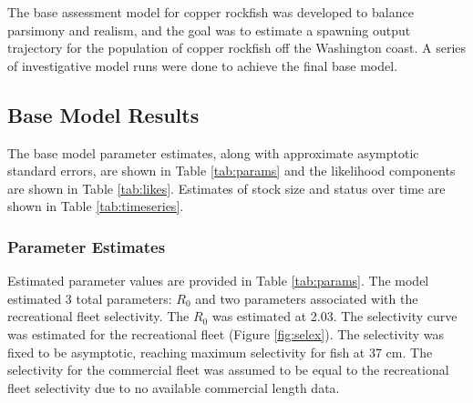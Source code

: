 \documentclass[11pt,
  english,
  a4paper,
]{article}
\begin{document}
The base assessment model for copper rockfish was developed to balance parsimony and realism, and the goal was to estimate a spawning output trajectory for the population of copper rockfish off the Washington coast. A series of investigative model runs were done to achieve the final base model.

\leavevmode\tagmcend\tagstructend\par


\hypertarget{base-model-results}{%
\subsection{Base Model Results}\label{base-model-results}}

\leavevmode\tagmcend\tagstructend


The base model parameter estimates, along with approximate asymptotic standard errors, are shown in Table \ref{tab:params} and the likelihood components are shown in Table \ref{tab:likes}. Estimates of stock size and status over time are shown in Table \ref{tab:timeseries}.

\leavevmode\tagmcend\tagstructend\par


\hypertarget{parameter-estimates}{%
\subsubsection{Parameter Estimates}\label{parameter-estimates}}

\leavevmode\tagmcend\tagstructend


Estimated parameter values are provided in Table \ref{tab:params}. The model estimated 3 total parameters: {\(R_0\)\leavevmode\tagmcend\tagstructend} and two parameters associated with the recreational fleet selectivity. The {\(R_0\)\leavevmode\tagmcend\tagstructend} was estimated at 2.03. The selectivity curve was estimated for the recreational fleet (Figure \ref{fig:selex}). The selectivity was fixed to be asymptotic, reaching maximum selectivity for fish at 37 cm. The selectivity for the commercial fleet was assumed to be equal to the recreational fleet selectivity due to no available commercial length data.
\end{document}
